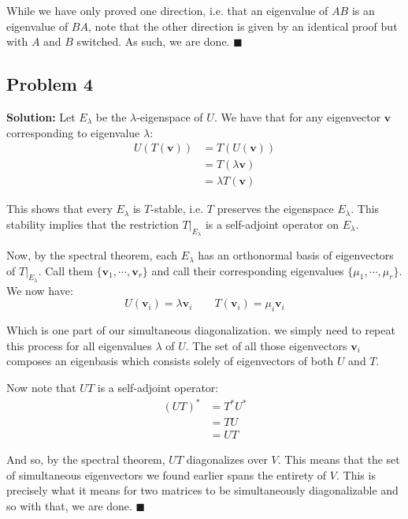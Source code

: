 \documentclass{article}
\renewcommand\vec{\mathbf}
\begin{document}
While we have only proved one direction, i.e. that an eigenvalue of $AB$ is an eigenvalue of $BA$, note that the other direction is given by an identical proof but with $A$ and $B$ switched. As such, we are done. $\blacksquare$
\newpage

\subsection*{Problem 4}
\noindent\textbf{Solution:} Let $E_{\lambda}$ be the $\lambda$-eigenspace of $U$. We have that for any eigenvector $\vec v$ corresponding to eigenvalue $\lambda$:
\begin{align*}
  U(T(\vec v))&=T(U(\vec v))\tag{commutative}\\
  &=T(\lambda\vec v)\tag{eigenvector}\\
  &=\lambda T(\vec v)\tag{linearity}
\end{align*}

This shows that every $E_{\lambda}$ is $T$-stable, i.e. $T$ preserves the eigenspace $E_{\lambda}$. This stability implies that the restriction $T|_{E_\lambda}$ is a self-adjoint operator on $E_\lambda$.

Now, by the spectral theorem, each $E_\lambda$ has an orthonormal basis of eigenvectors of $T|_{E_\lambda}$. Call them $\{\vec v_1,\cdots,\vec v_r\}$ and call their corresponding eigenvalues $\{\mu_1,\cdots,\mu_r\}$. We now have:
$$U(\vec v_i)=\lambda\vec v_i\qquad T(\vec v_i)=\mu_i\vec v_i$$

Which is one part of our simultaneous diagonalization. we simply need to repeat this process for all eigenvalues $\lambda$ of $U$. The set of all those eigenvectors $\vec v_i$ composes an eigenbasis which consists solely of eigenvectors of both $U$ and $T$.

Now note that $UT$ is a self-adjoint operator:
\begin{align*}
  (UT)^*&=T^*U^*\tag{anti-distributive}\\
  &=TU\tag{$T$ and $U$ are self-adjoint}\\
  &=UT\tag{$T$ and $U$ commute}
\end{align*}

And so, by the spectral theorem, $UT$ diagonalizes over $V$. This means that the set of simultaneous eigenvectors we found earlier spans the entirety of $V$. This is precisely what it means for two matrices to be simultaneously diagonalizable and so with that, we are done. $\blacksquare$
\newpage
\end{document}
